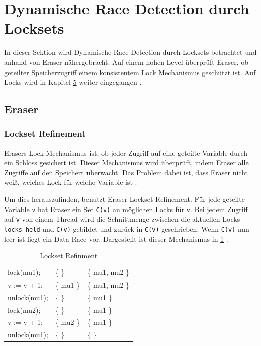 \section{Dynamische Race Detection durch Locksets}

In dieser Sektion wird Dynamische Race Detection durch Locksets betrachtet und anhand von Eraser nähergebracht. Auf einem hohen Level überprüft Eraser, ob geteilter Speicherzugriff einem konsistentem Lock Mechanismus geschützt ist. Auf Locks wird in Kapitel \hyperref[sec:loesen]{5} weiter eingegangen \cite[vgl.][392]{savage_eraser_nodate}.

\subsection*{Eraser}

\subsubsection*{Lockset Refinement}

Erasers Lock Mechanismus ist, ob jeder Zugriff auf eine geteilte Variable durch ein Schloss gesichert ist. Dieser Mechanismus wird überprüft, indem Eraser alle Zugriffe auf den Speichert überwacht. Das Problem dabei ist, dass Eraser nicht weiß, welches Lock für welche Variable ist \cite[vgl.][396]{savage_eraser_nodate}. 

Um dies herauszufinden, benutzt Eraser Lockset Refinement. Für jede geteilte Variable \texttt{v} hat Eraser ein Set \texttt{C(v)} an möglichen Locks für \texttt{v}. Bei jedem Zugriff auf \texttt{v} von einem Thread wird die Schnittmenge zwischen die aktuellen Locks \texttt{locks\_held} und \texttt{C(v)} gebildet und zurück in \texttt{C(v)} geschrieben. Wenn \texttt{C(v)} nun leer ist liegt ein Data Race vor. Dargestellt ist dieser Mechanismus in \ref{tab:locksetRefinment} \cite[vgl.][396-397]{savage_eraser_nodate}. 

\begin{table}[h]
    \myfloatalign
    \begin{tabularx}{\textwidth}{XXX} \toprule
        \tableheadline{Program} & \tableheadline{locks\_held}
        & \tableheadline{C(v)} \\ 
        \midrule
        lock(mu1); & \{ \} &  \{ mu1, mu2 \} \\
        v := v + 1; & \{ mu1 \} & \{ mu1, mu2 \} \\
        unlock(mu1); & \{ \} & \{ mu1 \} \\
        \midrule
        lock(mu2); & \{ \} & \{ mu1 \} \\
        v := v + 1; & \{ mu2 \} & \{ mu1 \} \\
        unlock(mu1); & \{ \} & \{ \} \\
        \bottomrule
    \end{tabularx}
    \caption[Lockset Refinment]{Lockset Refinment \cite[397]{savage_eraser_nodate}}
    \label{tab:locksetRefinment}
\end{table}

